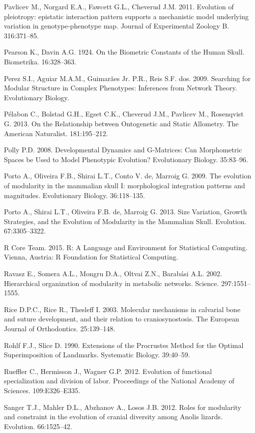 \documentclass[12pt,]{article}
\begin{document}
Pavlicev M., Norgard E.A., Fawcett G.L., Cheverud J.M. 2011. Evolution
of pleiotropy: epistatic interaction pattern supports a mechanistic
model underlying variation in genotype-phenotype map. Journal of
Experimental Zoology B. 316:371--85.

Pearson K., Davin A.G. 1924. On the Biometric Constants of the Human
Skull. Biometrika. 16:328--363.

Perez S.I., Aguiar M.A.M., Guimarães Jr. P.R., Reis S.F. dos. 2009.
Searching for Modular Structure in Complex Phenotypes: Inferences from
Network Theory. Evolutionary Biology.

Pélabon C., Bolstad G.H., Egset C.K., Cheverud J.M., Pavlicev M.,
Rosenqvist G. 2013. On the Relationship between Ontogenetic and Static
Allometry. The American Naturalist. 181:195--212.

Polly P.D. 2008. Developmental Dynamics and G-Matrices: Can Morphometric
Spaces be Used to Model Phenotypic Evolution? Evolutionary Biology.
35:83--96.

Porto A., Oliveira F.B., Shirai L.T., Conto V. de, Marroig G. 2009. The
evolution of modularity in the mammalian skull I: morphological
integration patterns and magnitudes. Evolutionary Biology. 36:118--135.

Porto A., Shirai L.T., Oliveira F.B. de, Marroig G. 2013. Size
Variation, Growth Strategies, and the Evolution of Modularity in the
Mammalian Skull. Evolution. 67:3305--3322.

R Core Team. 2015. R: A Language and Environment for Statistical
Computing. Vienna, Austria: R Foundation for Statistical Computing.

Ravasz E., Somera A.L., Mongru D.A., Oltvai Z.N., Barabási A.L. 2002.
Hierarchical organization of modularity in metabolic networks. Science.
297:1551--1555.

Rice D.P.C., Rice R., Thesleff I. 2003. Molecular mechanisms in
calvarial bone and suture development, and their relation to
craniosynostosis. The European Journal of Orthodontics. 25:139--148.

Rohlf F.J., Slice D. 1990. Extensions of the Procrustes Method for the
Optimal Superimposition of Landmarks. Systematic Biology. 39:40--59.

Rueffler C., Hermisson J., Wagner G.P. 2012. Evolution of functional
specialization and division of labor. Proceedings of the National
Academy of Sciences. 109:E326--E335.

Sanger T.J., Mahler D.L., Abzhanov A., Losos J.B. 2012. Roles for
modularity and constraint in the evolution of cranial diversity among
Anolis lizards. Evolution. 66:1525--42.
\end{document}
